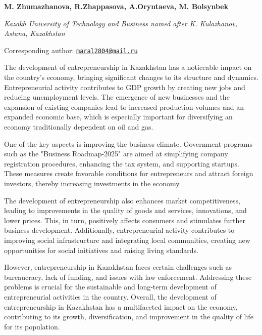 
\begin{articleheader}

{\bfseries M. Zhumazhanova\authorid,
R.Zhappasova\authorid,
A.Oryntaeva\authorid,
M. Bolsynbek\authorid}
\end{articleheader}

\begin{affiliation}
\emph{Kazakh University of Technology and Business named after K.
Kulazhanov, Astana, Kazakhstan}

\raggedright \textsuperscript{\envelope }Corresponding author: \href{mailto:maral2804@mail.ru}{\nolinkurl{maral2804@mail.ru}}
\end{affiliation}

The development of entrepreneurship in Kazakhstan has a noticeable
impact on the country's economy, bringing significant changes to its
structure and dynamics. Entrepreneurial activity contributes to GDP
growth by creating new jobs and reducing unemployment levels. The
emergence of new businesses and the expansion of existing companies lead
to increased production volumes and an expanded economic base, which is
especially important for diversifying an economy traditionally dependent
on oil and gas.

One of the key aspects is improving the business climate. Government
programs such as the "Business Roadmap-2025" are aimed at simplifying
company registration procedures, enhancing the tax system, and
supporting startups. These measures create favorable conditions for
entrepreneurs and attract foreign investors, thereby increasing
investments in the economy.

The development of entrepreneurship also enhances market
competitiveness, leading to improvements in the quality of goods and
services, innovations, and lower prices. This, in turn, positively
affects consumers and stimulates further business development.
Additionally, entrepreneurial activity contributes to improving social
infrastructure and integrating local communities, creating new
opportunities for social initiatives and raising living standards.

However, entrepreneurship in Kazakhstan faces certain challenges such as
bureaucracy, lack of funding, and issues with law enforcement.
Addressing these problems is crucial for the sustainable and long-term
development of entrepreneurial activities in the country. Overall, the
development of entrepreneurship in Kazakhstan has a multifaceted impact
on the economy, contributing to its growth, diversification, and
improvement in the quality of life for its population.

